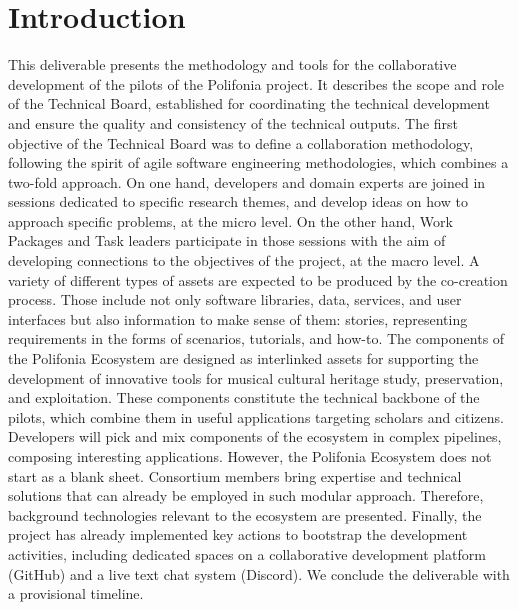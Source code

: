 \chapter{Introduction}\label{ch:introduction}
This deliverable presents the methodology and tools for the collaborative development of the pilots of the Polifonia project. It describes the scope and role of the Technical Board, established for coordinating the technical development and ensure the quality and consistency of the technical outputs. The first objective of the Technical Board was to define a collaboration methodology, following the spirit of agile software engineering methodologies, which combines a two-fold approach. On one hand, developers and domain experts are joined in sessions dedicated to specific research themes, and develop ideas on how to approach specific problems, at the micro level. On the other hand, Work Packages and Task leaders participate in those sessions with the aim of developing connections to the objectives of the project, at the macro level. A variety of different types of assets are expected to be produced by the co-creation process. Those include not only software libraries, data, services, and user interfaces but also information to make sense of them: stories, representing requirements in the forms of scenarios, tutorials, and how-to. The components of the Polifonia Ecosystem are designed as interlinked assets for supporting the development of innovative tools for musical cultural heritage study, preservation, and exploitation. These components constitute the technical backbone of the pilots, which combine them in useful applications targeting scholars and citizens. Developers will pick and mix components of the ecosystem in complex pipelines, composing interesting applications. However, the Polifonia Ecosystem does not start as a blank sheet. Consortium members bring expertise and technical solutions that can already be employed in such modular approach. Therefore, background technologies relevant to the ecosystem are presented. Finally, the project has already implemented key actions to bootstrap the development activities, including dedicated spaces on a collaborative development platform (GitHub) and a live text chat system (Discord). We conclude the deliverable with a provisional timeline.